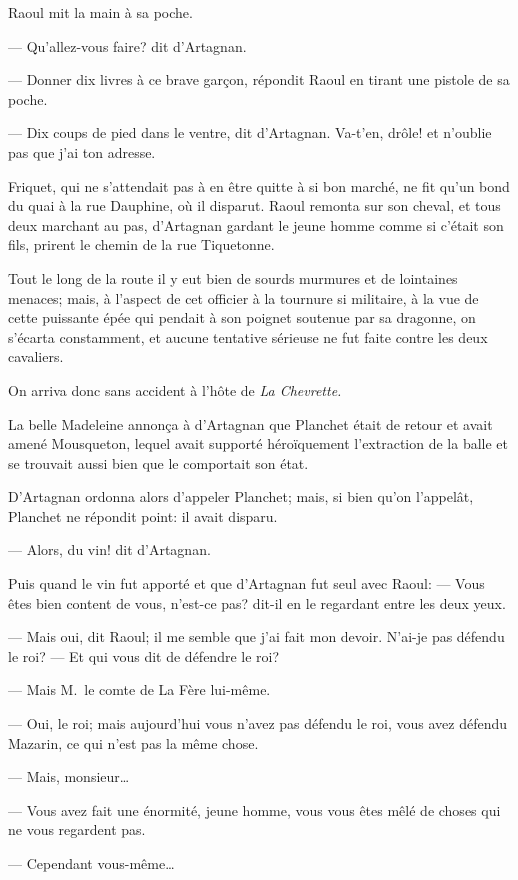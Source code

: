 Raoul mit la main à sa poche.

— Qu'allez-vous faire? dit d'Artagnan.

— Donner dix livres à ce brave garçon, répondit Raoul en tirant une pistole de sa poche.

— Dix coups de pied dans le ventre, dit d'Artagnan. Va-t'en, drôle! et n'oublie pas que j'ai ton adresse.

Friquet, qui ne s'attendait pas à en être quitte à si bon marché, ne fit qu'un bond du quai à la rue Dauphine, où il disparut. Raoul remonta sur son cheval, et tous deux marchant au pas, d'Artagnan gardant le jeune homme comme si c'était son fils, prirent le chemin de la rue Tiquetonne.

Tout le long de la route il y eut bien de sourds murmures et de lointaines menaces; mais, à l'aspect de cet officier à la tournure si militaire, à la vue de cette puissante épée qui pendait à son poignet soutenue par sa dragonne, on s'écarta constamment, et aucune tentative sérieuse ne fut faite contre les deux cavaliers.

On arriva donc sans accident à l'hôte de \textit{La Chevrette.}

La belle Madeleine annonça à d'Artagnan que Planchet était de retour et avait amené Mousqueton, lequel avait supporté héroïquement l'extraction de la balle et se trouvait aussi bien que le comportait son état.

D'Artagnan ordonna alors d'appeler Planchet; mais, si bien qu'on l'appelât, Planchet ne répondit point: il avait disparu.

— Alors, du vin! dit d'Artagnan.

Puis quand le vin fut apporté et que d'Artagnan fut seul avec Raoul:
— Vous êtes bien content de vous, n'est-ce pas? dit-il en le regardant entre les deux yeux.

— Mais oui, dit Raoul; il me semble que j'ai fait mon devoir. N'ai-je pas défendu le roi?
— Et qui vous dit de défendre le roi?

— Mais M.~le comte de La Fère lui-même.

— Oui, le roi; mais aujourd'hui vous n'avez pas défendu le roi, vous avez défendu Mazarin, ce qui n'est pas la même chose.

— Mais, monsieur\dots

— Vous avez fait une énormité, jeune homme, vous vous êtes mêlé de choses qui ne vous regardent pas.

— Cependant vous-même\dots

